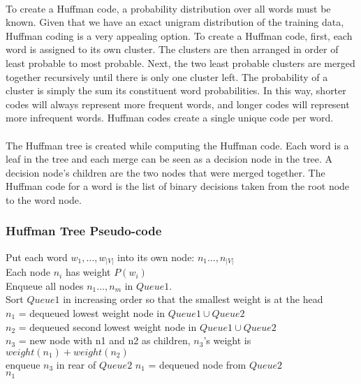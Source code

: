 \paragraph{}
To create a Huffman code, a probability distribution over all words must be known. Given that we have an exact unigram distribution of the training data, Huffman coding is a very appealing option. To create a Huffman code, first, each word is assigned to its own cluster.  The clusters are then arranged in order of least probable to most probable. Next, the two least probable clusters are merged together recursively until there is only one cluster left. The probability of a cluster is simply the sum its constituent word probabilities. In this way, shorter codes will always represent more frequent words, and longer codes will represent more infrequent words. Huffman codes create a single unique code per word.
\paragraph{}
The Huffman tree is created while computing the Huffman code. Each word is a leaf in the tree and each merge can be seen as a decision node in the tree. A decision node's children are the two nodes that were merged together. The Huffman code for a word is the list of binary decisions taken from the root node to the word node.

\subsubsection{Huffman Tree Pseudo-code}

\begin{algorithm}[H]
\SetAlgoLined
Put each word $w_1,\dots,w_{|V|}$ into its own node: $n_1\dots,n_{|V|}$
\\ Each node $n_i$ has weight $P(w_i)$
\\Enqueue all nodes $n_1\dots,n_m$ in $Queue1$.
\\Sort $Queue1$ in increasing order so that the smallest weight is at the head
\\  {
	$n_1$ = dequeued lowest weight node in $Queue1 \cup Queue2$
	\\$n_2$ = dequeued second lowest weight node in $Queue1 \cup Queue2$
	\\$n_3$ = new node with n1 and n2 as children,  $n_3$'s weight is $weight(n_1)+weight(n_2)$
	\\enqueue $n_3$ in rear of $Queue2$
}
$n_1$ = dequeued node from $Queue2$
\\ \Return $n_1$
\end{algorithm}



